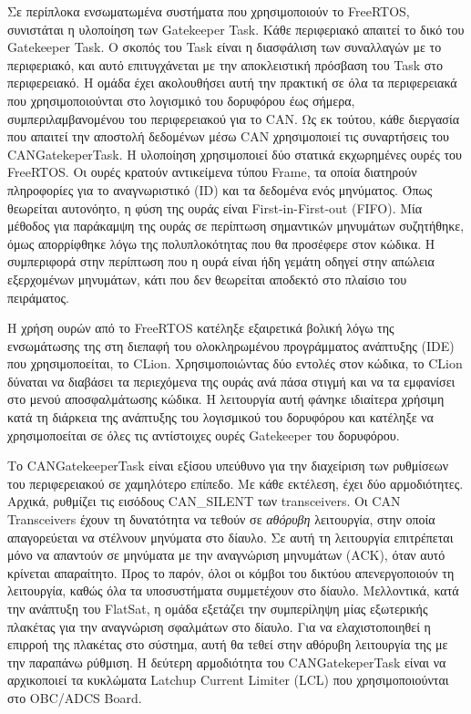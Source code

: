 \documentclass[a4paper,nobib,justified]{tufte-book}
\begin{document}
Σε περίπλοκα ενσωματωμένα συστήματα που χρησιμοποιούν το FreeRTOS, συνιστάται η υλοποίηση των Gatekeeper Task. Κάθε περιφεριακό απαιτεί το δικό του Gatekeeper Task. Ο σκοπός του Task είναι η διασφάλιση των συναλλαγών με το περιφεριακό, και αυτό επιτυγχάνεται με την αποκλειστική πρόσβαση του Task στο περιφερειακό. Η ομάδα έχει ακολουθήσει αυτή την πρακτική σε όλα τα περιφερειακά που χρησιμοποιούνται στο λογισμικό του δορυφόρου έως σήμερα, συμπεριλαμβανομένου του περιφερειακού για το CAN. Ως εκ τούτου, κάθε διεργασία που απαιτεί την αποστολή δεδομένων μέσω CAN χρησιμοποιεί τις συναρτήσεις του CANGatekeperTask. Η υλοποίηση χρησιμοποιεί δύο στατικά εκχωρημένες ουρές του FreeRTOS. Οι ουρές κρατούν αντικείμενα τύπου Frame, τα οποία διατηρούν πληροφορίες για το αναγνωριστικό (ID) και τα δεδομένα ενός μηνύματος. Όπως θεωρείται αυτονόητο, η φύση της ουράς είναι First-in-First-out (FIFO). Μία μέθοδος για παράκαμψη της ουράς σε περίπτωση σημαντικών μηνυμάτων συζητήθηκε, όμως απορρίφθηκε λόγω της πολυπλοκότητας που θα προσέφερε στον κώδικα. Η συμπεριφορά στην περίπτωση που η ουρά είναι ήδη γεμάτη οδηγεί στην απώλεια εξερχομένων μηνυμάτων, κάτι που δεν θεωρείται αποδεκτό στο πλαίσιο του πειράματος.

\par Η χρήση ουρών από το FreeRTOS κατέληξε εξαιρετικά βολική λόγω της ενσωμάτωσης της στη διεπαφή του ολοκληρωμένου προγράμματος ανάπτυξης (IDE) που χρησιμοποείται, το CLion. Χρησιμοποιώντας δύο εντολές στον κώδικα, το CLion δύναται να διαβάσει τα περιεχόμενα της ουράς ανά πάσα στιγμή και να τα εμφανίσει στο μενού αποσφαλμάτωσης κώδικα. Η λειτουργία αυτή φάνηκε ιδιαίτερα χρήσιμη κατά τη διάρκεια της ανάπτυξης του λογισμικού του δορυφόρου και κατέληξε να χρησιμοποείται σε όλες τις αντίστοιχες ουρές Gatekeeper του δορυφόρου.


\par Το CANGatekeeperTask είναι εξίσου υπεύθυνο για την διαχείριση των ρυθμίσεων του περιφερειακού σε χαμηλότερο επίπεδο. Με κάθε εκτέλεση, έχει δύο αρμοδιότητες. Αρχικά, ρυθμίζει τις εισόδους CAN\_SILENT των transceivers. Οι CAN Transceivers έχουν τη δυνατότητα να τεθούν σε \textit{αθόρυβη} λειτουργία, στην οποία απαγορεύεται να στέλνουν μηνύματα στο δίαυλο. Σε αυτή τη λειτουργία επιτρέπεται μόνο να απαντούν σε μηνύματα με την αναγνώριση μηνυμάτων (ACK), όταν αυτό κρίνεται απαραίτητο. Προς το παρόν, όλοι οι κόμβοι του δικτύου απενεργοποιούν τη λειτουργία, καθώς όλα τα υποσυστήματα συμμετέχουν στο δίαυλο. Μελλοντικά, κατά την ανάπτυξη του FlatSat, η ομάδα εξετάζει την συμπερίληψη μίας εξωτερικής πλακέτας για την αναγνώριση σφαλμάτων στο δίαυλο. Για να ελαχιστοποιηθεί η επιρροή της πλακέτας στο σύστημα, αυτή θα τεθεί στην αθόρυβη λειτουργία της με την παραπάνω ρύθμιση. Η δεύτερη αρμοδιότητα του CANGatekeperTask είναι να αρχικοποιεί τα κυκλώματα Latchup Current Limiter (LCL) που χρησιμοποιούνται στο OBC/ADCS Board. 
\end{document}
